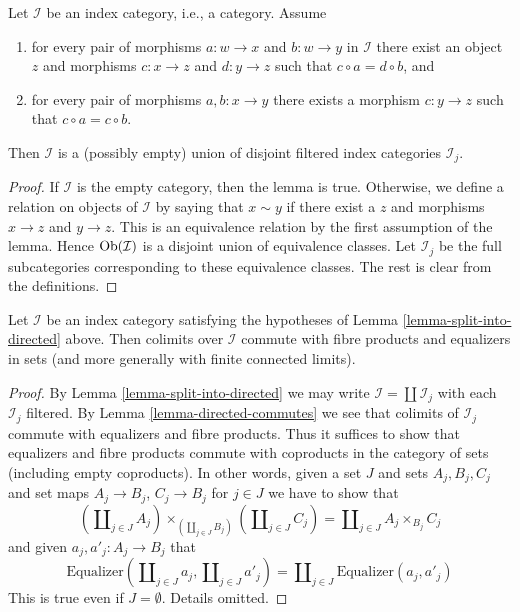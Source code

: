 \begin{lemma}
\label{lemma-split-into-directed}
Let $\mathcal{I}$ be an index category, i.e., a category.
Assume
\begin{enumerate}
\item for every pair of morphisms $a : w \to x$ and $b : w \to y$
in $\mathcal{I}$ there exist an object $z$ and morphisms $c : x \to z$
and $d : y \to z$ such that $c \circ a = d \circ b$, and
\item for every pair of morphisms $a, b : x \to y$ there exists
a morphism $c : y \to z$ such that $c \circ a = c \circ b$.
\end{enumerate}
Then $\mathcal{I}$ is a (possibly empty) union
of disjoint filtered index categories $\mathcal{I}_j$.
\end{lemma}

\begin{proof}
If $\mathcal{I}$ is the empty category, then the lemma is true.
Otherwise, we define a relation on objects of $\mathcal{I}$ by
saying that $x \sim y$ if there exist a $z$ and
morphisms $x \to z$ and $y \to z$. This is an equivalence
relation by the first assumption of the lemma. Hence $\mathop{\mathrm{Ob}}\nolimits(\mathcal{I})$
is a disjoint union of equivalence classes. Let $\mathcal{I}_j$
be the full subcategories corresponding to these equivalence classes.
The rest is clear from the definitions.
\end{proof}

\begin{lemma}
\label{lemma-almost-directed-commutes-equalizers}
Let $\mathcal{I}$ be an index category satisfying the hypotheses of
Lemma \ref{lemma-split-into-directed} above. Then colimits over $\mathcal{I}$
commute with fibre products and equalizers in sets (and more generally
with finite connected limits).
\end{lemma}

\begin{proof}
By
Lemma \ref{lemma-split-into-directed}
we may write $\mathcal{I} = \coprod \mathcal{I}_j$ with each $\mathcal{I}_j$
filtered. By
Lemma \ref{lemma-directed-commutes}
we see that colimits of $\mathcal{I}_j$ commute with equalizers and
fibre products. Thus it suffices to show that equalizers and fibre products
commute with coproducts in the category of sets (including empty coproducts).
In other words, given a set $J$ and sets $A_j, B_j, C_j$ and set maps
$A_j \to B_j$, $C_j \to B_j$ for $j \in J$ we have to show that
$$
(\coprod\nolimits_{j \in J} A_j)
\times_{(\coprod\nolimits_{j \in J} B_j)}
(\coprod\nolimits_{j \in J} C_j)
=
\coprod\nolimits_{j \in J} A_j \times_{B_j} C_j
$$
and given $a_j, a'_j : A_j \to B_j$ that
$$
\text{Equalizer}(
\coprod\nolimits_{j \in J} a_j,
\coprod\nolimits_{j \in J} a'_j)
=
\coprod\nolimits_{j \in J}
\text{Equalizer}(a_j, a'_j)
$$
This is true even if $J = \emptyset$. Details omitted.
\end{proof}



